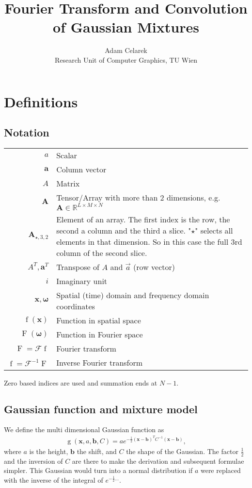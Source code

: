\documentclass{paper}
\title{Fourier Transform and Convolution of Gaussian Mixtures}
\author{Adam Celarek\\Research Unit of Computer Graphics, TU Wien}
\newcommand{\F}{\ensuremath{\mathcal{F}}}
\newcommand{\vr}[1]{\ensuremath{\boldsymbol{#1}}}
\newcommand{\tr}[1]{\ensuremath{\boldsymbol{#1}}}
\newcommand{\f}[1]{\operatorname{#1}}
\begin{document}
\maketitle

\section{Definitions}
\subsection*{Notation}
\begin{center}
	\begin{supertabular}{rp{8cm}}
		$a$	& Scalar \\
		$\vr{a}$	& Column vector \\
		$A$			& Matrix \\ 
		$\tr{A}$	& Tensor/Array with more than 2 dimensions, e.g. $\tr{A} \in \mathbb{R}^{L \times M \times N}$ \\ 
		$\tr{A}_{\star, 3, 2}$
					& Element of an array.
					The first index is the row, the second a column and the third a slice.
					"$\star$" selects all elements in that dimension.
					So in this case the full 3rd column of the second slice. \\ 
		$A^T, \vr{a}^T$
					& Transpose of $A$ and $\vec{a}$ (row vector) \\
		$i$			& Imaginary unit \\
		$\vr{x}, \vr{\omega}$
					& Spatial (time) domain and frequency domain coordinates \\
		$\f{f}(\vr{x})$
					& Function in spatial space \\
		$\f{F}(\vr{\omega})$
					& Function in Fourier space \\
		$\f{F} = \F \f{f}$
					& Fourier transform \\
		$\f{f} = \F^{-1} \f{F}$
					& Inverse Fourier transform \\
	\end{supertabular}
\end{center}
Zero based indices are used and summation ends at $N-1$.

\subsection*{Gaussian function and mixture model}
We define the multi dimensional Gaussian function as
\begin{align}
\f{g}(\vr{x}, a, \vr{b}, C) = a e^{-\frac{1}{2}(\vr{x}-\vr{b})^TC^{-1}(\vr{x}-\vr{b})},
\end{align}
where $a$ is the height, $\vr{b}$ the shift, and $C$ the shape of the Gaussian.
The factor $\frac{1}{2}$ and the inversion of $C$ are there to make the derivation and subsequent formulae simpler.
This Gaussian would turn into a normal distribution if $a$ were replaced with the inverse of the integral of $e^{-\frac{1}{2}...}$.
\end{document}
